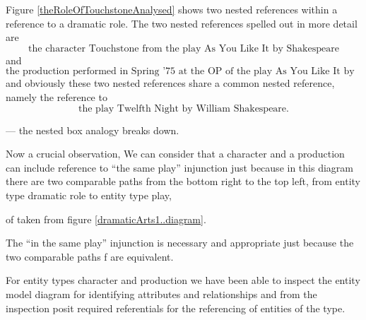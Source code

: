 \begin{oldtt}
\mynote Figure \ref{theRoleOfTouchstoneAnalysed} shows two nested references 
within a reference to a dramatic role. The two nested references spelled out in more detail are
\begin{equation}
\mbox{the character Touchstone from the play As You Like It by Shakespeare}
\end{equation}
and
\begin{equation}
\mbox{the production performed in Spring '75 at the OP of the play As You Like It by Shakespeare}
\end{equation}
and obviously these two nested references share a common nested reference, namely the reference to
\begin{equation}
\mbox{the play Twelfth Night by William Shakespeare.}
\end{equation}
\end{oldtt}
\begin{oldtt}
--- the nested box analogy breaks down.
\end{oldtt}
\mynote
\begin{worktt}
Now a crucial observation, 
We can consider that a character and a production can include reference to ``the same play'' injunction  just because in this diagram 
there are two comparable paths from the bottom right to the top left, from entity type dramatic role to entity type play, 
\end{worktt}

\begin{equation}
\label{dramaticArtsPortrayalScopeFragment..diagram}

\end{equation}
of taken from figure \ref{dramaticArts1..diagram}.

The ``in the same play'' injunction is necessary 
and appropriate just because 
the two comparable paths f are equivalent.



\begin{oldtt}For entity types character and production we have been able to inspect the entity model diagram for identifying  attributes and relationships and from the inspection posit required referentials  for the referencing of entities of the type.
\end{oldtt}

